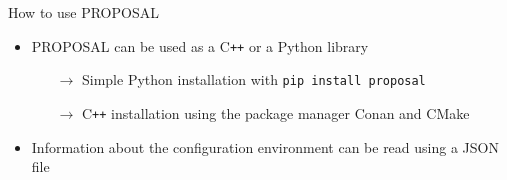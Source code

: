 \documentclass[t]{beamer}
\newlength{\itemseparation}
\begin{document}
\begin{columns}[onlytextwidth]
    \begin{column}{0.55\textwidth}%
      \begin{block}[equal height group=F]{How to use PROPOSAL}%
        \begin{itemize}
          \setlength\itemsep{\itemseparation}
          \item PROPOSAL can be used as a C\texttt{++} or a Python library
            \begin{itemize}
              \setlength\itemsep{\itemseparation}
              \item[$\rightarrow$] Simple Python installation with \colorbox{tuYellow}{\texttt{pip install proposal}}
              \item[$\rightarrow$] C\texttt{++} installation using the package manager Conan and CMake
            \end{itemize}
          \item Information about the configuration environment can be read using a JSON file
        \end{itemize}
        \vspace{-0.75em}
        \begin{columns}[onlytextwidth]
        \begin{column}{0.48\textwidth}
        \begin{mdframed}[backgroundcolor=light-gray, roundcorner=10pt,leftmargin=1, rightmargin=1, innerleftmargin=15, innertopmargin=15,innerbottommargin=15, outerlinewidth=1, linecolor=light-gray]

          
          \end{mdframed} 


\end{column}
\end{columns}
\end{block}
\end{column}
\end{columns}
\end{document}
